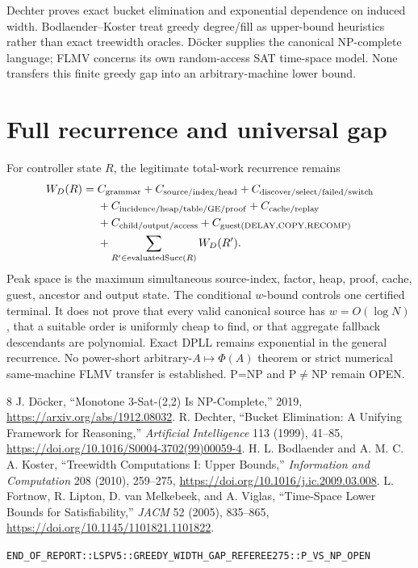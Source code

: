 \documentclass[11pt]{article}
\begin{document}
Dechter proves exact bucket elimination and exponential dependence on induced width.  Bodlaender--Koster treat greedy degree/fill as upper-bound heuristics rather than exact treewidth oracles.  D\"ocker supplies the canonical NP-complete language; FLMV concerns its own random-access SAT time-space model.  None transfers this finite greedy gap into an arbitrary-machine lower bound.

\section{Full recurrence and universal gap}
For controller state $R$, the legitimate total-work recurrence remains
\[
\begin{split}
W_D(R)={}&C_{\rm grammar}+C_{\rm source/index/head}+C_{\rm discover/select/failed/switch}\\
&+C_{\rm incidence/heap/table/GE/proof}+C_{\rm cache/replay}\\
&+C_{\rm child/output/access}+C_{\rm guest(DELAY,COPY,RECOMP)}\\
&+\sum_{R'\in\mathrm{evaluatedSucc}(R)}W_D(R').
\end{split}
\]
Peak space is the maximum simultaneous source-index, factor, heap, proof, cache, guest, ancestor and output state.  The conditional $w$-bound controls one certified terminal.  It does not prove that every valid canonical source has $w=O(\log N)$, that a suitable order is uniformly cheap to find, or that aggregate fallback descendants are polynomial.  Exact DPLL remains exponential in the general recurrence.  No power-short arbitrary-$A\mapsto\Phi(A)$ theorem or strict numerical same-machine FLMV transfer is established.  P=NP and P$\ne$NP remain OPEN.

\begin{thebibliography}{8}
 J. D\"ocker, ``Monotone 3-Sat-(2,2) Is NP-Complete,'' 2019, \url{https://arxiv.org/abs/1912.08032}.
 R. Dechter, ``Bucket Elimination: A Unifying Framework for Reasoning,'' \emph{Artificial Intelligence} 113 (1999), 41--85, \url{https://doi.org/10.1016/S0004-3702(99)00059-4}.
 H. L. Bodlaender and A. M. C. A. Koster, ``Treewidth Computations I: Upper Bounds,'' \emph{Information and Computation} 208 (2010), 259--275, \url{https://doi.org/10.1016/j.ic.2009.03.008}.
 L. Fortnow, R. Lipton, D. van Melkebeek, and A. Viglas, ``Time-Space Lower Bounds for Satisfiability,'' \emph{JACM} 52 (2005), 835--865, \url{https://doi.org/10.1145/1101821.1101822}.
\end{thebibliography}

\noindent\texttt{END\_OF\_REPORT::LSPV5::GREEDY\_WIDTH\_GAP\_REFEREE275::P\_VS\_NP\_OPEN}
\end{document}
